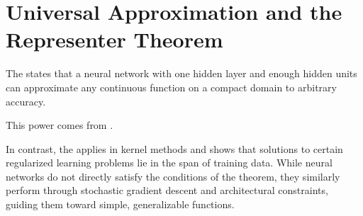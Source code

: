 \documentclass[letterpaper,10pt,english]{jupyterBook}
\begin{document}
\section{Universal Approximation and the Representer Theorem}
\label{\detokenize{neuralnets_intro:universal-approximation-and-the-representer-theorem}}
\sphinxAtStartPar
The  states that a neural network with one hidden layer and enough hidden units can approximate any continuous function on a compact domain to arbitrary accuracy.

\sphinxAtStartPar
This power comes from .

\sphinxAtStartPar
In contrast, the  applies in kernel methods and shows that solutions to certain regularized learning problems lie in the span of training data. While neural networks do not directly satisfy the conditions of the theorem, they similarly perform  through stochastic gradient descent and architectural constraints, guiding them toward simple, generalizable functions.

\sphinxstepscope
\end{document}
